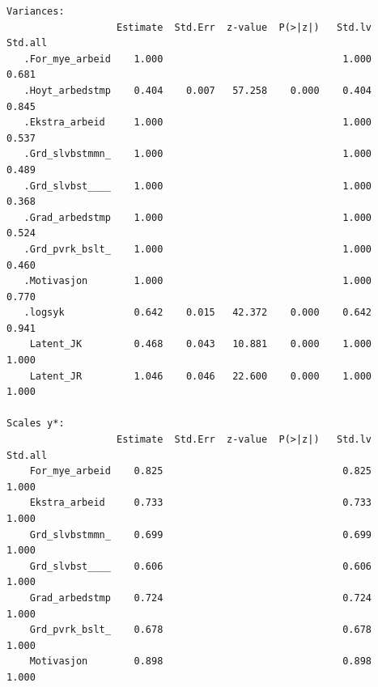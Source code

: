 \documentclass[
  12pt,
  a4paper,
  DIV=11,
  numbers=noendperiod]{scrartcl}
\begin{document}
\begin{verbatim}
Variances:
                   Estimate  Std.Err  z-value  P(>|z|)   Std.lv  Std.all
   .For_mye_arbeid    1.000                               1.000    0.681
   .Hoyt_arbedstmp    0.404    0.007   57.258    0.000    0.404    0.845
   .Ekstra_arbeid     1.000                               1.000    0.537
   .Grd_slvbstmmn_    1.000                               1.000    0.489
   .Grd_slvbst____    1.000                               1.000    0.368
   .Grad_arbedstmp    1.000                               1.000    0.524
   .Grd_pvrk_bslt_    1.000                               1.000    0.460
   .Motivasjon        1.000                               1.000    0.770
   .logsyk            0.642    0.015   42.372    0.000    0.642    0.941
    Latent_JK         0.468    0.043   10.881    0.000    1.000    1.000
    Latent_JR         1.046    0.046   22.600    0.000    1.000    1.000

Scales y*:
                   Estimate  Std.Err  z-value  P(>|z|)   Std.lv  Std.all
    For_mye_arbeid    0.825                               0.825    1.000
    Ekstra_arbeid     0.733                               0.733    1.000
    Grd_slvbstmmn_    0.699                               0.699    1.000
    Grd_slvbst____    0.606                               0.606    1.000
    Grad_arbedstmp    0.724                               0.724    1.000
    Grd_pvrk_bslt_    0.678                               0.678    1.000
    Motivasjon        0.898                               0.898    1.000
\end{verbatim}
\end{document}
